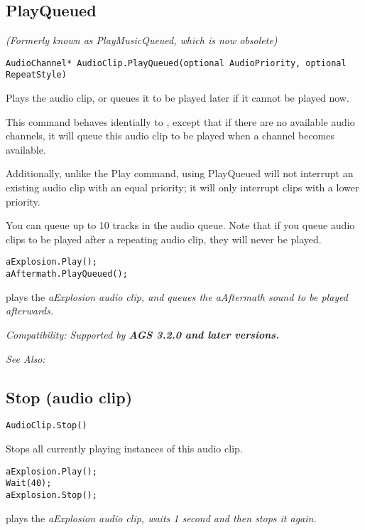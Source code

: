 \subsection{PlayQueued}\label{AudioClip.PlayQueued}%

\it{(Formerly known as PlayMusicQueued, which is now obsolete)}

\begin{verbatim}
AudioChannel* AudioClip.PlayQueued(optional AudioPriority, optional RepeatStyle)
\end{verbatim}
Plays the audio clip, or queues it to be played later if it cannot be played now.

This command behaves identially to ,
except that if there are no available audio channels, it will queue this audio clip
to be played when a channel becomes available.

Additionally, unlike the Play command, using PlayQueued will not interrupt an existing audio
clip with an equal priority; it will only interrupt clips with a lower priority.

You can queue up to 10 tracks in the audio queue. Note that if you queue audio clips to
be played after a repeating audio clip, they will never be played.

\begin{verbatim}
aExplosion.Play();
aAftermath.PlayQueued();
\end{verbatim}
plays the \it{aExplosion} audio clip, and queues the \it{aAftermath} sound to be played
afterwards.

\it{Compatibility:} Supported by \bf{AGS 3.2.0} and later versions.

\it{See Also:} 


\subsection{Stop (audio clip)}\label{AudioClip.Stop}%

\begin{verbatim}
AudioClip.Stop()
\end{verbatim}
Stops all currently playing instances of this audio clip.

\begin{verbatim}
aExplosion.Play();
Wait(40);
aExplosion.Stop();
\end{verbatim}
plays the \it{aExplosion} audio clip, waits 1 second and then stops it again.

